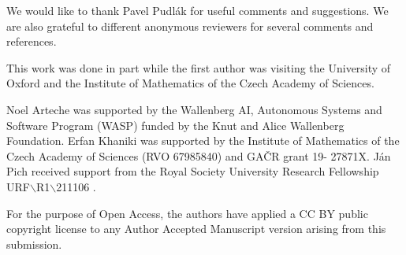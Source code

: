 \documentclass[11pt]{article}
\theoremstyle{definition}
\theoremstyle{plain}
\theoremstyle{remark}
\begin{document}
We would like to thank Pavel Pudlák for useful comments and suggestions. We are also grateful to different anonymous reviewers for several comments and references.

This work was done in part while the first author was visiting the University of Oxford and the Institute of Mathematics of the Czech Academy of Sciences.

Noel Arteche was supported by the Wallenberg AI, Autonomous Systems and Software Program (WASP) funded by the Knut and Alice Wallenberg Foundation. Erfan Khaniki was supported by the Institute of Mathematics of the Czech Academy of Sciences (RVO 67985840) and GAČR grant 19-
27871X. J\'an Pich received support from the Royal Society University Research Fellowship URF$\backslash$R1$\backslash$211106 .

For the purpose of Open Access, the authors have applied a CC BY public copyright license to any Author Accepted Manuscript version arising from this submission.

\printbibliography[
        heading=bibintoc
]
\end{document}
